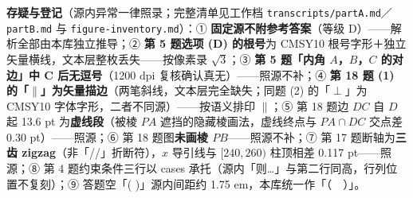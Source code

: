 \begin{gktip}
\textbf{存疑与登记}（源内异常一律照录；完整清单见工作档 \texttt{transcripts/partA.md}／\texttt{partB.md} 与 \texttt{figure-inventory.md}）：① \textbf{固定源不附参考答案}（等级 D）——解析全部由本库独立推导；② \textbf{第 5 题选项 (D) 的根号}为 CMSY10 根号字形＋独立矢量横线，文本层整枚丢失——按像素录 \(\sqrt{3}\)；③ \textbf{第 5 题「内角 \(A\)，\(B\)，\(C\) 的对边」中 C 后无逗号}（1200 dpi 复核确认真无）——照源不补；④ \textbf{第 18 题 (1) 的「$\parallel$」为矢量描边}（两笔斜线，文本层完全缺失；同题 (2) 的「\(\perp\)」为 CMSY10 字体字形，二者不同源）——按语义排印 \(\parallel\)；⑤ 第 18 题边 \(DC\) 自 \(D\) 起 13.6 pt 为\textbf{虚线段}（被棱 \(PA\) 遮挡的隐藏棱画法，虚线终点与 \(PA\cap DC\) 交点差 0.30 pt）——照源；⑥ 第 18 题图\textbf{未画棱 \(PB\)}——照源不补；⑦ 第 17 题断轴为\textbf{三齿 zigzag}（非「//」折断符），\(x\) 导引线与 \([240,260)\) 柱顶相差 0.117 pt——照源；⑧ 第 4 题约束条件三行以 cases 承托（源内「则…」与第二行同高，行列位置不复刻）；⑨ 答题空「( )」源内间距约 1.75 em，本库统一作「（　）」。
\end{gktip}



